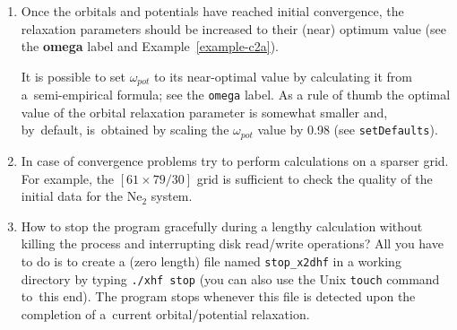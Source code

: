 \documentclass[12pt,a4paper]{article}
\newcommand{\ft}[1]{\texttt{#1}}
\begin{document}
\begin{enumerate}
\item Once the orbitals and potentials have reached initial
  convergence, the relaxation parameters should be increased to their
  (near) optimum value (see the \textbf{omega} label and
  Example~\ref{example-c2a}).

  It is possible to set $\omega_{pot}$ to its near-optimal value by
  calculating it from a~semi-empirical formula; see the \ft{omega}
  label. As a rule of thumb the optimal value of the orbital
  relaxation parameter is somewhat smaller and, by~default,
  is~obtained by scaling the $\omega_{pot}$ value by 0.98 (see
  \ft{setDefaults}).


\item In case of convergence problems try to perform calculations on a
  sparser grid. For example, the $[61\times 79/30]$ grid is
  sufficient to check the quality of the initial data for the Ne$_2$
  system.

\item \label{section:hints} How to stop the program gracefully during
  a lengthy calculation without killing the process and interrupting
  disk read/write operations?  All you have to do is to create a (zero
  length) file named \texttt{stop\_x2dhf} in a working directory by
  typing \texttt{./xhf stop} (you can also use the Unix \texttt{touch}
  command to~this end). The program stops whenever this file is
  detected upon the completion of a~current orbital/potential
  relaxation.



\end{enumerate}
\end{document}
